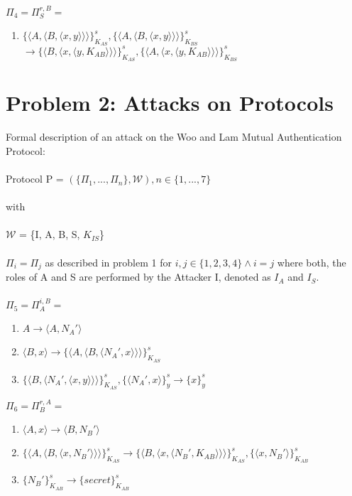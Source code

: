 \documentclass[12pt,pdftex,a4paper]{article}
\newcommand\tab[1][1cm]{\hspace*{#1}}
\begin{document}
$\Pi_4 = \Pi_S^{r,B} =$
\begin{enumerate}
\item \tab $ \{\langle A, \langle B, \langle x, y\rangle\rangle\rangle\}_{K_{AS}}^s, \{\langle A, \langle B, \langle x, y\rangle\rangle\rangle\}_{K_{BS}}^s $ \\ \tab $\rightarrow \{\langle B, \langle x, \langle y, K_{AB}\rangle\rangle\rangle\}_{K_{AS}}^s,\{\langle A, \langle x, \langle y, K_{AB}\rangle\rangle\rangle\}_{K_{BS}}^s $
\end{enumerate}

\newpage
\section*{Problem 2: Attacks on Protocols}
Formal description of an attack on the Woo and Lam Mutual Authentication Protocol:\\~\\
Protocol P = $(\{\Pi_1, ..., \Pi_n\}, \mathcal{W}), n \in \{1,...,7\}$ \\~\\
with\\~\\
$\mathcal{W}$ = \{I, A, B, S, $K_{IS}$\}\\~\\
$\Pi_i = \Pi_j$ as described in problem 1 for $i,j\in \{1,2,3,4\}\land i=j$ where both, the roles of A and S are performed by the Attacker I, denoted as $I_A$ and $I_S$.\\~\\

$\Pi_5 = \Pi_A^{i,B} =$
\begin{enumerate}
	\item \tab $ A \rightarrow \langle A, N_A'\rangle $
	\item \tab $ \langle B, x \rangle \rightarrow \{\langle A, \langle B, \langle N_A', x\rangle\rangle\rangle\}_{K_{AS}}^s$	
	\item \tab $ \{\langle B,\langle N_A', \langle x, y\rangle\rangle\rangle\}_{K_{AS}}^{s}, \{\langle N_A', x\rangle\}_y^s \rightarrow \{x\}_y^s $
\end{enumerate}

$\Pi_6 = \Pi_B^{r,A} =$
\begin{enumerate}
\item \tab $\langle A, x\rangle \rightarrow \langle B, N_B' \rangle$
\item \tab $\{\langle A, \langle B, \langle x, N_B' \rangle\rangle\rangle\}_{K_{AS}}^s
\rightarrow \{\langle B,\langle x, \langle N_B', K_{AB}\rangle\rangle\rangle\}_{K_{AS}}^{s}, \{\langle x, N_B'\rangle\}_{K_{AB}}^s$
\item \tab $ \{N_B'\}_{K_{AB}}^s \rightarrow \{secret\}_{K_{AB}}^s$
\end{enumerate}
\end{document}
